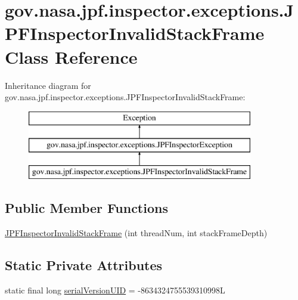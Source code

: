 \hypertarget{classgov_1_1nasa_1_1jpf_1_1inspector_1_1exceptions_1_1_j_p_f_inspector_invalid_stack_frame}{}\section{gov.\+nasa.\+jpf.\+inspector.\+exceptions.\+J\+P\+F\+Inspector\+Invalid\+Stack\+Frame Class Reference}
\label{classgov_1_1nasa_1_1jpf_1_1inspector_1_1exceptions_1_1_j_p_f_inspector_invalid_stack_frame}
Inheritance diagram for gov.\+nasa.\+jpf.\+inspector.\+exceptions.\+J\+P\+F\+Inspector\+Invalid\+Stack\+Frame\+:\begin{figure}[H]
\begin{center}
\leavevmode
\includegraphics[height=3.000000cm]{classgov_1_1nasa_1_1jpf_1_1inspector_1_1exceptions_1_1_j_p_f_inspector_invalid_stack_frame}
\end{center}
\end{figure}
\subsection*{Public Member Functions}
\begin{DoxyCompactItemize}
\item 
\hyperlink{classgov_1_1nasa_1_1jpf_1_1inspector_1_1exceptions_1_1_j_p_f_inspector_invalid_stack_frame_a1b3d81cba44ddeb750c0b0f1b11465c3}{J\+P\+F\+Inspector\+Invalid\+Stack\+Frame} (int thread\+Num, int stack\+Frame\+Depth)
\end{DoxyCompactItemize}
\subsection*{Static Private Attributes}
\begin{DoxyCompactItemize}
\item 
static final long \hyperlink{classgov_1_1nasa_1_1jpf_1_1inspector_1_1exceptions_1_1_j_p_f_inspector_invalid_stack_frame_af4c610c4ef5786c27cc17c25f0e0cba3}{serial\+Version\+U\+ID} = -\/8634324755539310998L
\end{DoxyCompactItemize}


